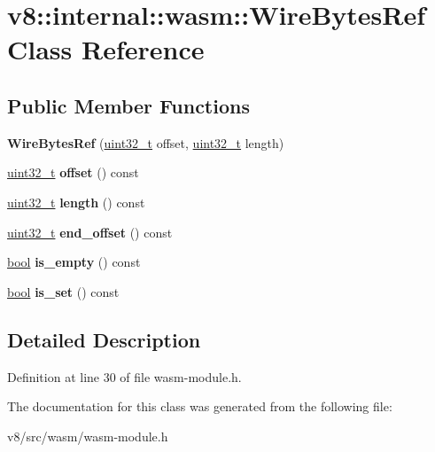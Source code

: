 \hypertarget{classv8_1_1internal_1_1wasm_1_1WireBytesRef}{}\section{v8\+:\+:internal\+:\+:wasm\+:\+:Wire\+Bytes\+Ref Class Reference}
\label{classv8_1_1internal_1_1wasm_1_1WireBytesRef}
\subsection*{Public Member Functions}
\begin{DoxyCompactItemize}
\item 
\mbox{\label{classv8_1_1internal_1_1wasm_1_1WireBytesRef_a8bd0e5beb8253a5b61b4606c3d97c4a4}} 
{\bfseries Wire\+Bytes\+Ref} (\mbox{\hyperlink{classuint32__t}{uint32\+\_\+t}} offset, \mbox{\hyperlink{classuint32__t}{uint32\+\_\+t}} length)
\item 
\mbox{\label{classv8_1_1internal_1_1wasm_1_1WireBytesRef_a4f2dffb7efc3721571b5f1604d5d448a}} 
\mbox{\hyperlink{classuint32__t}{uint32\+\_\+t}} {\bfseries offset} () const
\item 
\mbox{\label{classv8_1_1internal_1_1wasm_1_1WireBytesRef_a774ebe7b8a6138f9fa8dc6d4817912c3}} 
\mbox{\hyperlink{classuint32__t}{uint32\+\_\+t}} {\bfseries length} () const
\item 
\mbox{\label{classv8_1_1internal_1_1wasm_1_1WireBytesRef_a1853a6fc4a88a37d2bb8a91b58781daf}} 
\mbox{\hyperlink{classuint32__t}{uint32\+\_\+t}} {\bfseries end\+\_\+offset} () const
\item 
\mbox{\label{classv8_1_1internal_1_1wasm_1_1WireBytesRef_a45fb66d092f08cdf54005a1ebdfbd901}} 
\mbox{\hyperlink{classbool}{bool}} {\bfseries is\+\_\+empty} () const
\item 
\mbox{\label{classv8_1_1internal_1_1wasm_1_1WireBytesRef_a94db77b7254197e7ed15d4851dcc3934}} 
\mbox{\hyperlink{classbool}{bool}} {\bfseries is\+\_\+set} () const
\end{DoxyCompactItemize}


\subsection{Detailed Description}


Definition at line 30 of file wasm-\/module.\+h.



The documentation for this class was generated from the following file\+:\begin{DoxyCompactItemize}
\item 
v8/src/wasm/wasm-\/module.\+h\end{DoxyCompactItemize}
